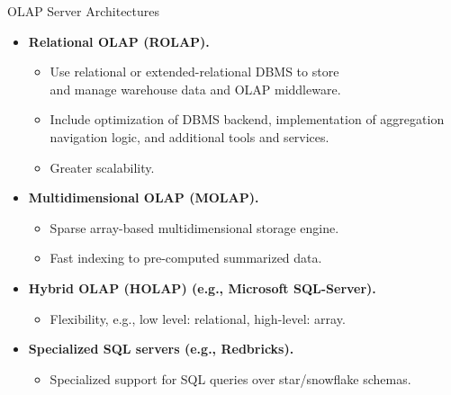 \begin{frame}{OLAP Server Architectures}
  \begin{itemize}
  \item \textbf{Relational OLAP (ROLAP).}
    \begin{itemize}
    \item Use relational or extended-relational DBMS to store \\
      and manage warehouse data and OLAP middleware.
    \item Include optimization of DBMS backend, implementation of aggregation navigation logic, and additional tools and services.
    \item Greater scalability.
    \end{itemize}
  \item \textbf{Multidimensional OLAP (MOLAP).}
    \begin{itemize}
    \item Sparse array-based multidimensional storage engine.
    \item Fast indexing to pre-computed summarized data.
    \end{itemize}
  \item \textbf{Hybrid OLAP (HOLAP) (e.g., Microsoft SQL-Server).}
    \begin{itemize}
    \item Flexibility, e.g., low level: relational, high-level: array.
    \end{itemize}
  \item \textbf{Specialized SQL servers (e.g., Redbricks).}
    \begin{itemize}
    \item Specialized support for SQL queries over star/snowflake schemas.
    \end{itemize}
  \end{itemize}
\end{frame}
